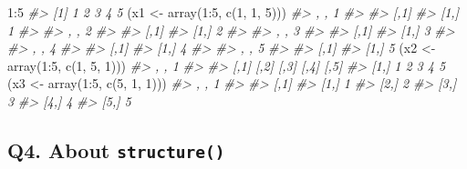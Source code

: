 \documentclass[
]{book}
\newenvironment{Shaded}{\begin{snugshade}}{\end{snugshade}}
\newcommand{\CommentTok}[1]{\textcolor[rgb]{0.56,0.35,0.01}{\textit{#1}}}
\newcommand{\DecValTok}[1]{\textcolor[rgb]{0.00,0.00,0.81}{#1}}
\newcommand{\FunctionTok}[1]{\textcolor[rgb]{0.00,0.00,0.00}{#1}}
\newcommand{\NormalTok}[1]{#1}
\newcommand{\OtherTok}[1]{\textcolor[rgb]{0.56,0.35,0.01}{#1}}
\newcommand{\SpecialCharTok}[1]{\textcolor[rgb]{0.00,0.00,0.00}{#1}}
\begin{document}
\begin{Shaded}
\begin{Highlighting}[]
\DecValTok{1}\SpecialCharTok{:}\DecValTok{5}
\CommentTok{\#\textgreater{} [1] 1 2 3 4 5}
\NormalTok{(x1 }\OtherTok{\textless{}{-}} \FunctionTok{array}\NormalTok{(}\DecValTok{1}\SpecialCharTok{:}\DecValTok{5}\NormalTok{, }\FunctionTok{c}\NormalTok{(}\DecValTok{1}\NormalTok{, }\DecValTok{1}\NormalTok{, }\DecValTok{5}\NormalTok{)))}
\CommentTok{\#\textgreater{} , , 1}
\CommentTok{\#\textgreater{} }
\CommentTok{\#\textgreater{}      [,1]}
\CommentTok{\#\textgreater{} [1,]    1}
\CommentTok{\#\textgreater{} }
\CommentTok{\#\textgreater{} , , 2}
\CommentTok{\#\textgreater{} }
\CommentTok{\#\textgreater{}      [,1]}
\CommentTok{\#\textgreater{} [1,]    2}
\CommentTok{\#\textgreater{} }
\CommentTok{\#\textgreater{} , , 3}
\CommentTok{\#\textgreater{} }
\CommentTok{\#\textgreater{}      [,1]}
\CommentTok{\#\textgreater{} [1,]    3}
\CommentTok{\#\textgreater{} }
\CommentTok{\#\textgreater{} , , 4}
\CommentTok{\#\textgreater{} }
\CommentTok{\#\textgreater{}      [,1]}
\CommentTok{\#\textgreater{} [1,]    4}
\CommentTok{\#\textgreater{} }
\CommentTok{\#\textgreater{} , , 5}
\CommentTok{\#\textgreater{} }
\CommentTok{\#\textgreater{}      [,1]}
\CommentTok{\#\textgreater{} [1,]    5}
\NormalTok{(x2 }\OtherTok{\textless{}{-}} \FunctionTok{array}\NormalTok{(}\DecValTok{1}\SpecialCharTok{:}\DecValTok{5}\NormalTok{, }\FunctionTok{c}\NormalTok{(}\DecValTok{1}\NormalTok{, }\DecValTok{5}\NormalTok{, }\DecValTok{1}\NormalTok{)))}
\CommentTok{\#\textgreater{} , , 1}
\CommentTok{\#\textgreater{} }
\CommentTok{\#\textgreater{}      [,1] [,2] [,3] [,4] [,5]}
\CommentTok{\#\textgreater{} [1,]    1    2    3    4    5}
\NormalTok{(x3 }\OtherTok{\textless{}{-}} \FunctionTok{array}\NormalTok{(}\DecValTok{1}\SpecialCharTok{:}\DecValTok{5}\NormalTok{, }\FunctionTok{c}\NormalTok{(}\DecValTok{5}\NormalTok{, }\DecValTok{1}\NormalTok{, }\DecValTok{1}\NormalTok{)))}
\CommentTok{\#\textgreater{} , , 1}
\CommentTok{\#\textgreater{} }
\CommentTok{\#\textgreater{}      [,1]}
\CommentTok{\#\textgreater{} [1,]    1}
\CommentTok{\#\textgreater{} [2,]    2}
\CommentTok{\#\textgreater{} [3,]    3}
\CommentTok{\#\textgreater{} [4,]    4}
\CommentTok{\#\textgreater{} [5,]    5}
\end{Highlighting}
\end{Shaded}

\hypertarget{q4.-about-structure}{%
\subsection*{\texorpdfstring{Q4. About \texttt{structure()}}{Q4. About structure()}}\label{q4.-about-structure}}
\end{document}
